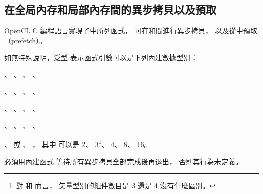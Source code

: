\subsection[sec:asyncCopyPrefetch]{在全局內存和局部內存間的異步拷貝以及預取}

OpenCL C 編程語言實現了中所列函式，
可在和間進行異步拷貝，
以及從中預取（prefetch）。

如無特殊說明，泛型  表示函式引數可以是下列內建數據型別：
\startigBase[indentnext=no]
\item {}、 、 、 、
\item {}、 、 、 、
\item {}、 、 、 、
\item {}、 、 、 、
\item {}、  或 、 ，
\stopigBase
其中  可以是 2、 3\footnote{
對  和  而言，
矢量型別的組件數目是 3 還是 4 沒有什麼區別。}、 4、 8、 16。

{}

\startnotepar
{}必須用內建函式  等待所有異步拷貝全部完成後再退出，
否則其行為未定義。
\stopnotepar

